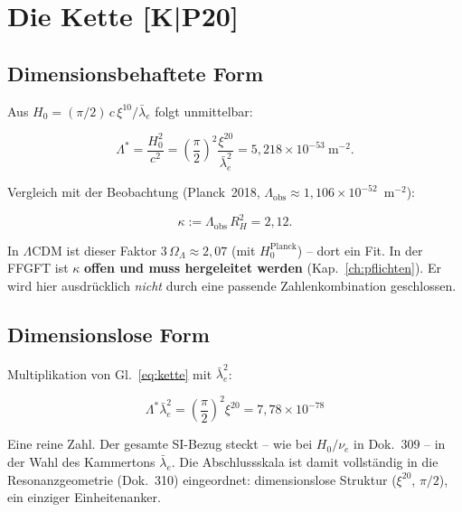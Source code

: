 \documentclass[11pt]{report}
\begin{document}
\chapter{Die Kette [K|P20]}

\section{Dimensionsbehaftete Form}

Aus $H_0 = (\pi/2)\,c\,\xi^{10}/\bar\lambda_e$ folgt unmittelbar:

\begin{equation}
  \Lambda^{*}
  = \frac{H_0^2}{c^2}
  = \left(\frac{\pi}{2}\right)^{2}\frac{\xi^{20}}{\bar\lambda_e^{2}}
  = 5{,}218\times10^{-53}~\text{m}^{-2}.
  \label{eq:kette}
\end{equation}

Vergleich mit der Beobachtung (Planck~2018,
$\Lambda_\text{obs} \approx 1{,}106\times10^{-52}$~m$^{-2}$):

\begin{equation}
  \kappa := \Lambda_\text{obs}\,R_H^{2} = 2{,}12.
  \label{eq:kappa}
\end{equation}

In $\Lambda$CDM ist dieser Faktor $3\,\Omega_\Lambda \approx 2{,}07$
(mit $H_0^\text{Planck}$) -- dort ein Fit. In der FFGFT ist $\kappa$
\textbf{offen und muss hergeleitet werden} (Kap.~\ref{ch:pflichten}). Er wird hier
ausdrücklich \emph{nicht} durch eine passende Zahlenkombination
geschlossen.

\section{Dimensionslose Form}

Multiplikation von Gl.~\eqref{eq:kette} mit $\bar\lambda_e^2$:

\begin{equation}
  \boxed{\;\Lambda^{*}\bar\lambda_e^{2}
  = \left(\frac{\pi}{2}\right)^{2}\xi^{20}
  = 7{,}78\times10^{-78}\;}
  \label{eq:dimlos}
\end{equation}

Eine reine Zahl. Der gesamte SI-Bezug steckt -- wie bei $H_0/\nu_e$
in Dok.~309 -- in der Wahl des Kammertons $\bar\lambda_e$. Die
Abschlussskala ist damit vollständig in die Resonanzgeometrie
(Dok.~310) eingeordnet: dimensionslose Struktur ($\xi^{20}$, $\pi/2$),
ein einziger Einheitenanker.
\end{document}
